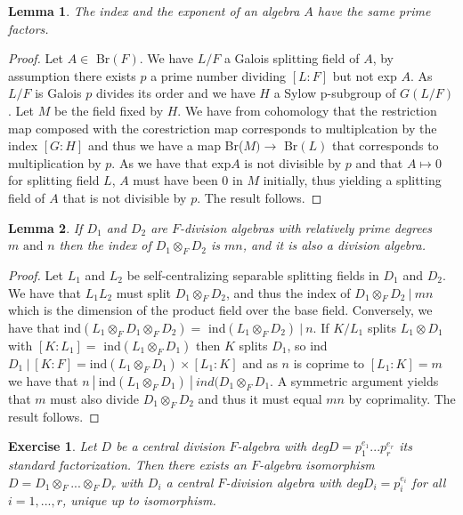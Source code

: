 \documentclass{article}
\newtheorem{lemma}{Lemma}[section]
\newtheorem{exercise}{Exercise}[section]
\begin{document}
\begin{lemma}
The index and the exponent of an algebra $A$ have the same prime factors.
\end{lemma}

\begin{proof}
  Let $A \in$ Br$(F)$. We have $L/F$ a Galois splitting field of $A$, by assumption there exists $p$ a prime number dividing $[L:F]$ but not exp $A$. As $L/F$ is Galois $p$ divides its order and we have $H$ a Sylow p-subgroup of $G(L/F)$. Let $M$ be the field fixed by $H$. We have from cohomology that the restriction map composed with the corestriction map corresponds to multiplcation by the index $[G:H]$ and thus  we have a map Br($M) \to$ Br$(L)$ that corresponds to multiplication by $p$. As we have that exp$A$ is not divisible by $p$ and that $A \mapsto 0$ for splitting field $L$, $A$ must have been 0 in $M$ initially, thus yielding a splitting field of $A$ that is not divisible by $p$. The result follows. 
\end{proof}

\begin{lemma}
If $D_{1}$ and $D_{2}$ are $F$-division algebras with relatively prime degrees $m \text{ and } n$ then the index of $D_{1} \otimes_{F} D_{2}$ is $mn$, and it is also a division algebra.
  \end{lemma}

  \begin{proof}
    Let $L_{1}$ and $L_{2}$ be self-centralizing separable splitting fields in $D_{1}$ and $D_{2}$. We have that $L_{1}L_{2}$ must split $D_{1} \otimes_{F} D_{2}$, and thus the index of $D_{1}\otimes_{F} D_{2}\ | \ mn$ which is the dimension of the product field over the base field. Conversely, we have that ind$(L_{1} \otimes_{F}D_{1} \otimes_{F}D_{2}) =$ ind$(L_{1}\otimes_{F}D_{2}) \ | \ n$. If $K/L_{1}$ splits  $L_{1} \otimes D_{1}$ with $[K:L_{1}] = $ ind$(L_{1} \otimes_{F} D_{1})$ then $K$ splits $D_{1}$, so ind$D_{1} \ | \ [K:F] = \text{ind}(L_{1} \otimes_{F} D_{1}) \times [L_{1}:K]$ and as $n$ is coprime to $[L_{1}:K] = m$ we have that $n \ | \ \text{ind}(L_{1} \otimes_{F} D_{1}) \ | \ ind(D_{1}\otimes_{F} D_{1}$. A symmetric argument yields that $m$ must also divide $D_{1} \otimes_{F} D_{2}$ and thus it must equal $mn$ by coprimality. The result follows.         
  \end{proof}

  \begin{exercise}

    Let $D$ be a central division $F$-algebra with deg$D = p_{1}^{e_{1}}  ...  p_{r}^{e_{r}}$ its
standard factorization. Then there exists an $F$-algebra isomorphism
$D = D_{1} \otimes_{F} ... \otimes_{F} D_{r}$ with $D_{i}$ a central $F$-division algebra with
deg$D_{i} = p_{i}^{e_{i}}$ for all $i = 1, . . . , r$, unique up to isomorphism.
\end{exercise}
\end{document}
